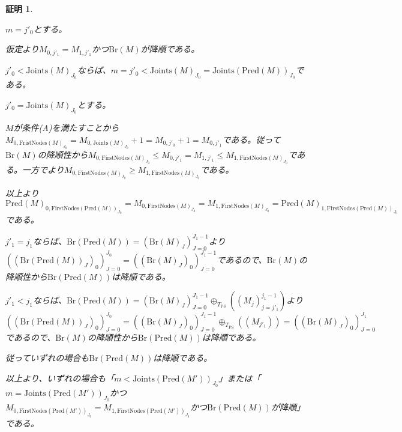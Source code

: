 \documentclass[dvipdfmx,uplatex]{jsarticle}
\theoremstyle{customnonumberbreakfortheorem}
\theoremstyle{customnonumberbreakforproof}
\newtheorem{hideableproof}{証明}
\begin{document}
\begin{hideableproof}
\begin{indented}
\begin{indented}
			\item \(m = j'_0\)とする。
			\item 仮定より\(M_{0,j'_1} = M_{1,j'_1}\)かつ\(\textrm{Br}(M)\)が降順である。
			\item \(j'_0 < \textrm{Joints}(M)_{J_0}\)ならば、\(m = j'_0 < \textrm{Joints}(M)_{J_0} = \textrm{Joints}(\textrm{Pred}(M))_{J_0}\)である。
			\item \(j'_0 = \textrm{Joints}(M)_{J_0}\)とする。
			\begin{indented}
				\item \(M\)が条件(A)を満たすことから\(M_{0,\textrm{FristNodes}(M)_{J_0}} = M_{0,\textrm{Joints}(M)_{J_0}}+1 = M_{0,j'_0}+1 = M_{0,j'_1}\)である。従って\(\textrm{Br}(M)\)の降順性から\(M_{0,\textrm{FirstNodes}(M)_{J_0}} \leq M_{0,j'_1} = M_{1,j'_1} \leq M_{1,\textrm{FirstNodes}(M)_{J_0}}\)である。一方でより\(M_{0,\textrm{FirstNodes}(M)_{J_0}} \geq M_{1,\textrm{FirstNodes}(M)_{J_0}}\)である。
				\item 以上より\(\textrm{Pred}(M)_{0,\textrm{FirstNodes}(\textrm{Pred}(M))_{J_0}} = M_{0,\textrm{FirstNodes}(M)_{J_0}} = M_{1,\textrm{FirstNodes}(M)_{J_0}} = \textrm{Pred}(M)_{1,\textrm{FirstNodes}(\textrm{Pred}(M))_{J_0}}\)である。
				\item \(j'_1 = j_1\)ならば、\(\textrm{Br}(\textrm{Pred}(M)) = (\textrm{Br}(M)_J)_{J=0}^{J_1-1}\)より\(((\textrm{Br}(\textrm{Pred}(M))_J)_0)_{J=0}^{J_0} = ((\textrm{Br}(M)_J)_0)_{J=0}^{J_1-1}\)であるので、\(\textrm{Br}(M)\)の降順性から\(\textrm{Br}(\textrm{Pred}(M))\)は降順である。
				\item \(j'_1 < j_1\)ならば、\(\textrm{Br}(\textrm{Pred}(M)) = (\textrm{Br}(M)_J)_{J=0}^{J_1-1} \oplus_{T_{\textrm{PS}}} ((M_j)_{j=j'_1}^{j_1-1})\)より\(((\textrm{Br}(\textrm{Pred}(M))_J)_0)_{J=0}^{J_0} = ((\textrm{Br}(M)_J)_0)_{J=0}^{J_1-1} \oplus_{T_{\textrm{PS}}} ((M_{j'_1})) = ((\textrm{Br}(M)_J)_0)_{J=0}^{J_1}\)であるので、\(\textrm{Br}(M)\)の降順性から\(\textrm{Br}(\textrm{Pred}(M))\)は降順である。
				\item 従っていずれの場合も\(\textrm{Br}(\textrm{Pred}(M))\)は降順である。
			\end{indented}
			\item 以上より、いずれの場合も「\(m < \textrm{Joints}(\textrm{Pred}(M'))_{J_0}\)」または「\(m = \textrm{Joints}(\textrm{Pred}(M'))_{J_0}\)かつ\(M_{0,\textrm{FirstNodes}(\textrm{Pred}(M'))_{J_0}} = M_{1,\textrm{FirstNodes}(\textrm{Pred}(M'))_{J_0}}\)かつ\(\textrm{Br}(\textrm{Pred}(M))\)が降順」である。
			\item

\end{indented}
\end{indented}
\end{hideableproof}
\end{document}
